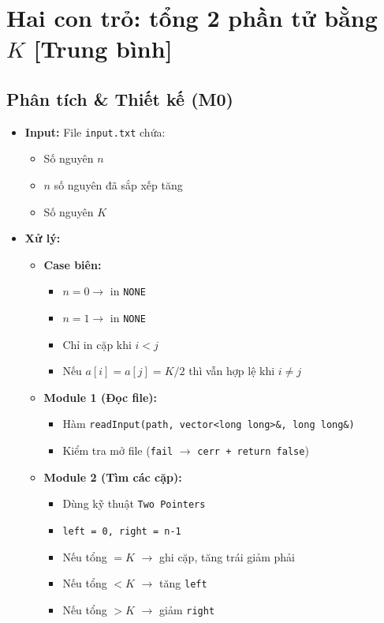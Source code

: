 \section{Hai con trỏ: tổng 2 phần tử bằng $K$ [Trung bình]}
\subsection{Phân tích \& Thiết kế (M0)}
\begin{itemize}
    \item \textbf{Input:}
    File \texttt{input.txt} chứa:
    \begin{itemize}
        \item Số nguyên $n$
        \item $n$ số nguyên đã sắp xếp tăng
        \item Số nguyên $K$
    \end{itemize}

    \item \textbf{Xử lý:}
    \begin{itemize}
        \item \textbf{Case biên:}
        \begin{itemize}
            \item $n = 0 \rightarrow$ in \texttt{NONE}
            \item $n = 1 \rightarrow$ in \texttt{NONE}
            \item Chỉ in cặp khi $i < j$
            \item Nếu $a[i] = a[j] = K/2$ thì vẫn hợp lệ khi $i \ne j$
        \end{itemize}

        \item \textbf{Module 1 (Đọc file):}
        \begin{itemize}
            \item Hàm \texttt{readInput(path, vector<long long>\&, long long\&)}
            \item Kiểm tra mở file (\texttt{fail} $\rightarrow$ \texttt{cerr + return false})
        \end{itemize}

        \item \textbf{Module 2 (Tìm các cặp):}
        \begin{itemize}
            \item Dùng kỹ thuật \texttt{Two Pointers}
            \item \texttt{left = 0, right = n-1}
            \item Nếu tổng $= K$ $\rightarrow$ ghi cặp, tăng trái giảm phải
            \item Nếu tổng $< K$ $\rightarrow$ tăng \texttt{left}
            \item Nếu tổng $> K$ $\rightarrow$ giảm \texttt{right}
        \end{itemize}


\end{itemize}
\end{itemize}
